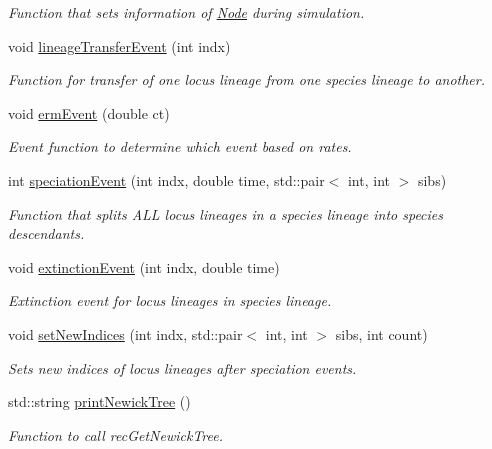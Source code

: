 \begin{DoxyCompactItemize}
\begin{DoxyCompactList}\small\item\em Function that sets information of \mbox{\hyperlink{class_node}{Node}} during simulation. \end{DoxyCompactList}\item 
void \mbox{\hyperlink{class_locus_tree_a8123a4d6570c6325e5924dfc6644d430}{lineage\+Transfer\+Event}} (int indx)
\begin{DoxyCompactList}\small\item\em Function for transfer of one locus lineage from one species lineage to another. \end{DoxyCompactList}\item 
void \mbox{\hyperlink{class_locus_tree_ac26a76f2505dc80a9e45a501f5463427}{erm\+Event}} (double ct)
\begin{DoxyCompactList}\small\item\em Event function to determine which event based on rates. \end{DoxyCompactList}\item 
int \mbox{\hyperlink{class_locus_tree_aa02492f9fddec2f4a340d8d3171c22fa}{speciation\+Event}} (int indx, double time, std\+::pair$<$ int, int $>$ sibs)
\begin{DoxyCompactList}\small\item\em Function that splits A\+LL locus lineages in a species lineage into species descendants. \end{DoxyCompactList}\item 
void \mbox{\hyperlink{class_locus_tree_a3834ac0ce434f88fabd27de70c950076}{extinction\+Event}} (int indx, double time)
\begin{DoxyCompactList}\small\item\em Extinction event for locus lineages in species lineage. \end{DoxyCompactList}\item 
void \mbox{\hyperlink{class_locus_tree_a6ae1511b9e291777a6ef9364c243722d}{set\+New\+Indices}} (int indx, std\+::pair$<$ int, int $>$ sibs, int count)
\begin{DoxyCompactList}\small\item\em Sets new indices of locus lineages after speciation events. \end{DoxyCompactList}\item 
std\+::string \mbox{\hyperlink{class_locus_tree_ab4a4727ab800808da5031a16eccb3162}{print\+Newick\+Tree}} ()
\begin{DoxyCompactList}\small\item\em Function to call rec\+Get\+Newick\+Tree. \end{DoxyCompactList}\item 

\end{DoxyCompactItemize}
